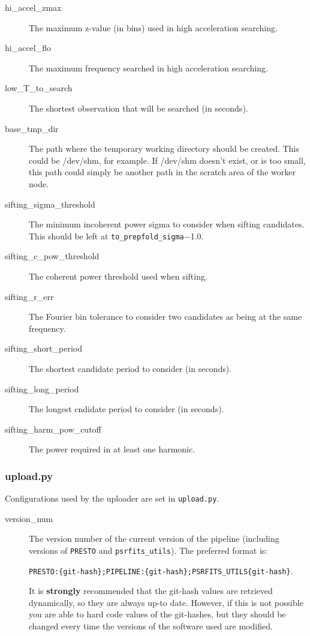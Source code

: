\begin{description}
    \item[hi\_accel\_zmax] The maximum z-value (in bins) used in high acceleration searching.
    \item[hi\_accel\_flo] The maximum frequency searched in high acceleration searching.
    \item[low\_T\_to\_search] The shortest observation that will be searched (in seconds).
    \item[base\_tmp\_dir] The path where the temporary working directory should be created. This could be /dev/shm, for example. If /dev/shm doesn't exist, or is too small, this path could simply be another path in the scratch area of the worker node.
    \item[sifting\_sigma\_threshold] The minimum incoherent power sigma to consider when sifting candidates. This should be left at \texttt{to\_prepfold\_sigma}$-$1.0.
    \item[sifting\_c\_pow\_threshold] The coherent power threshold used when sifting.
    \item[sifting\_r\_err] The Fourier bin tolerance to consider two candidates as being at the same frequency.
    \item[sifting\_short\_period] The shortest candidate period to consider (in seconds).
    \item[sifting\_long\_period] The longest cndidate period to consider (in seconds).
    \item[sifting\_harm\_pow\_cutoff] The power required in at least one harmonic.
\end{description}
    

\subsubsection{upload.py}
Configurations used by the uploader are set in \texttt{upload.py}.

\begin{description}
    \item[version\_num] The version number of the current version of the pipeline (including versions of \texttt{PRESTO} and \texttt{psrfits\_utils}). The preferred format is:
    
    \texttt{PRESTO:\{git-hash\};PIPELINE:\{git-hash\};PSRFITS\_UTILS\{git-hash\}}. 
    
    It is \textbf{strongly} recommended that the git-hash values are retrieved dynamically, so they are always up-to date. However, if this is not possible you are able to hard code values of the git-hashes, but they should be changed every time the versions of the software used are modified.
\end{description}


